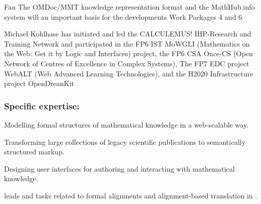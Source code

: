 \begin{sitedescription}{Fau}
The \textsf{OMDoc/MMT} knowledge representation format and the \textsf{MathHub.info}
system will an important basis for the developments Work Packages 4 and 6.

Michael Kohlhase has initiated and led the CALCULEMUS! IHP-Research and Training Network
and participated in the FP6 IST MoWGLI (Mathematics on the Web: Get it by Logic and
Interfaces) project, the FP6 CSA Once-CS (Open Network of Centres of Excellence in Complex
Systems), The FP7 EDC project WebALT (Web Advanced Learning Technologies), and the H2020
Infrastructure project OpenDreanKit

\subsubsection*{Specific expertise:}
\begin{compactitem}
\item Modelling formal structures of mathematical knowledge in a web-scalable way.
\item Transforming large collections of legacy scientific publications to semantically
  structured markup.
\item Designing user interfaces for authoring and interacting with mathematical knowledge.
\end{compactitem}

 leads  and tasks related to formal alignments and
alignment-based translation in .
\end{sitedescription}

